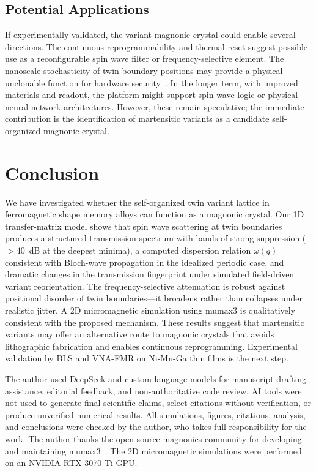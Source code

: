 \documentclass[aip,jap,reprint,floatfix,nofootinbib]{revtex4-2}
\begin{document}
\subsection{Potential Applications}
\label{sec:applications}

If experimentally validated, the variant magnonic crystal could enable several directions. The continuous reprogrammability and thermal reset suggest possible use as a reconfigurable spin wave filter or frequency-selective element. The nanoscale stochasticity of twin boundary positions may provide a physical unclonable function for hardware security~\cite{Pappu2002}. In the longer term, with improved materials and readout, the platform might support spin wave logic or physical neural network architectures. However, these remain speculative; the immediate contribution is the identification of martensitic variants as a candidate self-organized magnonic crystal.

\section{Conclusion}
\label{sec:conclusion}

We have investigated whether the self-organized twin variant lattice in ferromagnetic shape memory alloys can function as a magnonic crystal. Our 1D transfer-matrix model shows that spin wave scattering at twin boundaries produces a structured transmission spectrum with bands of strong suppression ($>40$~dB at the deepest minima), a computed dispersion relation $\omega(q)$ consistent with Bloch-wave propagation in the idealized periodic case, and dramatic changes in the transmission fingerprint under simulated field-driven variant reorientation. The frequency-selective attenuation is robust against positional disorder of twin boundaries---it broadens rather than collapses under realistic jitter. A 2D micromagnetic simulation using mumax3 is qualitatively consistent with the proposed mechanism. These results suggest that martensitic variants may offer an alternative route to magnonic crystals that avoids lithographic fabrication and enables continuous reprogramming. Experimental validation by BLS and VNA-FMR on Ni-Mn-Ga thin films is the next step.

\begin{acknowledgments}
The author used DeepSeek and custom language models for manuscript drafting assistance, editorial feedback, and non-authoritative code review. AI tools were not used to generate final scientific claims, select citations without verification, or produce unverified numerical results. All simulations, figures, citations, analysis, and conclusions were checked by the author, who takes full responsibility for the work. The author thanks the open-source magnonics community for developing and maintaining mumax3~\cite{Vansteenkiste2014}. The 2D micromagnetic simulations were performed on an NVIDIA RTX 3070 Ti GPU.
\end{acknowledgments}
\end{document}
